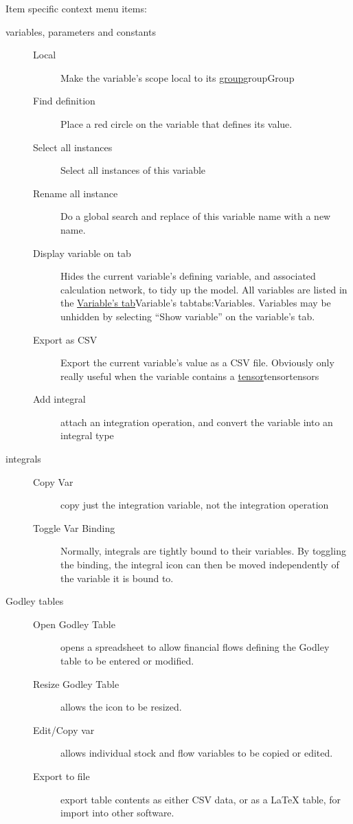 Item specific context menu items:
\begin{description}
\item[variables, parameters and constants]\mbox{}
  \begin{description}
  \item[Local] Make the variable's scope local to its
    \hyperref[ref]{group}{group}{}{Group}
  \item[Find definition] Place a red circle on the variable that
    defines its value.
  \item[Select all instances] Select all instances of this variable
  \item[Rename all instance] Do a global search and replace of this
    variable name with a new name.
  \item[Display variable on tab] Hides the current variable's defining
    variable, and associated calculation network, to tidy up the
    model. All variables are listed in the \hyperref[ref]{Variable's
      tab}{Variable's tab}{}{tabs:Variables}. Variables may be
    unhidden by selecting ``Show variable'' on the variable's tab.
  \item[Export as CSV] Export the current variable's value as a CSV
    file. Obviously only really useful when the variable contains a
    \hyperref[ref]{tensor}{tensor}{}{tensors}
  \item[Add integral] attach an integration operation, and convert the
    variable into an integral type
  \end{description}
\item[integrals]\mbox{}
  \begin{description}
  \item[Copy Var] copy just the integration variable, not the
    integration operation
  \item[Toggle Var Binding] Normally, integrals are tightly bound to
    their variables. By toggling the binding, the integral icon can
    then be moved independently of the variable it is bound to.
  \end{description}
\item[Godley tables]\mbox{}
  \begin{description}
  \item[Open Godley Table] opens a spreadsheet to allow financial
    flows defining the Godley table to be entered or modified.
  \item[Resize Godley Table] allows the icon to be resized.
  \item[Edit/Copy var] allows individual stock and flow variables to
    be copied or edited.
  \item[Export to file] export table contents as either CSV data, or
    as a LaTeX table, for import into other software.
  \end{description}
        

\end{description}

